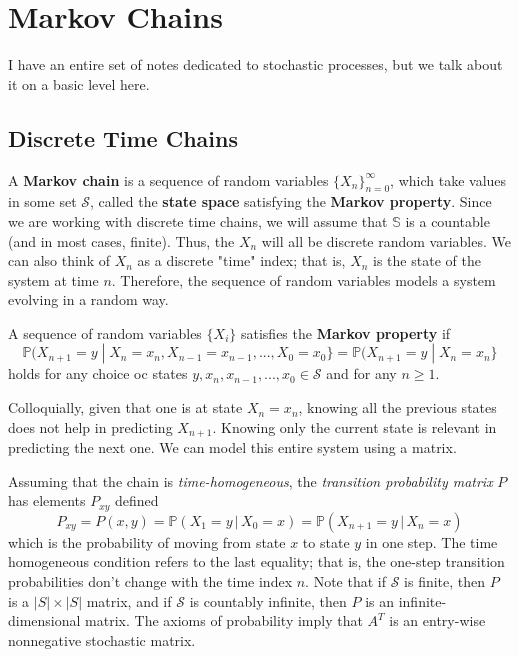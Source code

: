 \section{Markov Chains}

  I have an entire set of notes dedicated to stochastic processes, but we talk about it on a basic level here. 

\subsection{Discrete Time Chains}

  \begin{definition}
    A \textbf{Markov chain} is a sequence of random variables $\{X_n\}_{n=0}^\infty$, which take values in some set $\mathcal{S}$, called the \textbf{state space} satisfying the \textbf{Markov property}. Since we are working with discrete time chains, we will assume that $\mathbb{S}$ is a countable (and in most cases, finite). Thus, the $X_n$ will all be discrete random variables. We can also think of $X_n$ as a discrete "time" index; that is, $X_n$ is the state of the system at time $n$. Therefore, the sequence of random variables models a system evolving in a random way. 
  \end{definition}

  \begin{definition}
    A sequence of random variables $\{X_i\}$ satisfies the \textbf{Markov property} if 
    \begin{equation}
      \mathbb{P}(X_{n+1} = y \; | \; X_n = x_n, X_{n-1} = x_{n-1}, ..., X_0 = x_0\} = \mathbb{P}(X_{n+1} = y \; | \; X_n = x_n\}
    \end{equation}
    holds for any choice oc states $y, x_n, x_{n-1}, ..., x_0 \in \mathcal{S}$ and for any $n \geq 1$. 
  \end{definition}

  Colloquially, given that one is at state $X_n = x_n$, knowing all the previous states does not help in predicting $X_{n+1}$. Knowing only the current state is relevant in predicting the next one. We can model this entire system using a matrix. 

  \begin{definition}
    Assuming that the chain is \textit{time-homogeneous}, the \textit{transition probability matrix} $P$ has elements $P_{x y}$ defined
    \begin{equation}
      P_{x y} = P(x, y) = \mathbb{P}(X_1 = y \,|\, X_0 = x) = \mathbb{P}(X_{n+1} = y \,|\, X_n = x)
    \end{equation}
    which is the probability of moving from state $x$ to state $y$ in one step. The time homogeneous condition refers to the last equality; that is, the one-step transition probabilities don't change with the time index $n$. Note that if $\mathcal{S}$ is finite, then $P$ is a $|S| \times |S|$ matrix, and if $\mathcal{S}$ is countably infinite, then $P$ is an infinite-dimensional matrix. The axioms of probability imply that $A^T$ is an entry-wise nonnegative stochastic matrix.
  \end{definition}

